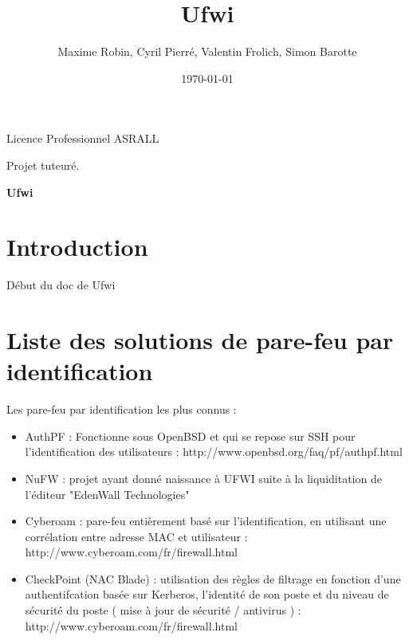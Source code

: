 \documentclass[12pt]{report}
\title{Ufwi}
\author{Maxime Robin, Cyril Pierré, Valentin Frolich, Simon Barotte}
\date{\today}
\begin{document}
\thispagestyle{empty}
\begin{center}
Licence Professionnel ASRALL


Projet tuteuré.

\vspace{2,5cm}
\textbf{\Huge Ufwi}


\end{center}



\newpage

\renewcommand{\contentsname}{Sommaire}
\tableofcontents

\newpage

\chapter{Introduction}
Début du doc de Ufwi

\chapter{Liste des solutions de pare-feu par identification}
Les pare-feu par identification les plus connus : 
  \begin{itemize}
    \item AuthPF : Fonctionne sous OpenBSD et qui se repose sur SSH pour l'identification des utilisateurs : http://www.openbsd.org/faq/pf/authpf.html
    \item NuFW : projet ayant donné naissance à UFWI suite à la liquiditation de l'éditeur "EdenWall Technologies"
    \item Cyberoam : pare-feu entièrement basé sur l'identification, en utilisant une corrélation entre adresse MAC et utilisateur : http://www.cyberoam.com/fr/firewall.html
    \item CheckPoint (NAC Blade) : utilisation des règles de filtrage en fonction d'une authentifcation basée sur Kerberos, l'identité de son poste et du niveau de sécurité du poste ( mise à jour de sécurité / antivirus ) : http://www.cyberoam.com/fr/firewall.html
  \end{itemize}
\end{document}
